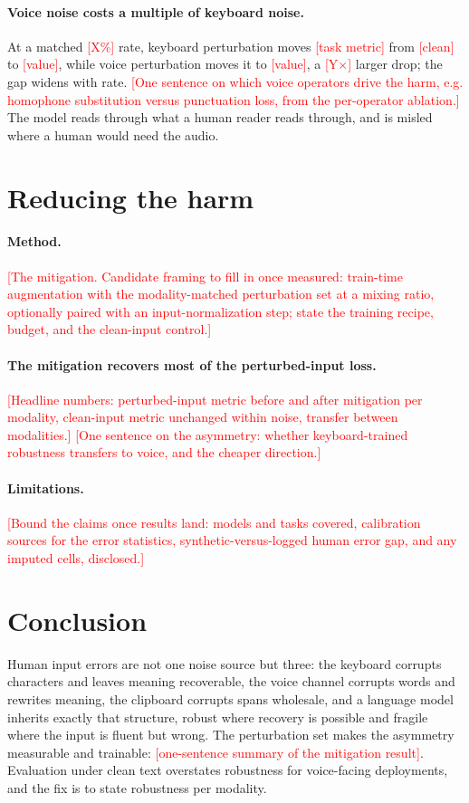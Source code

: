 \documentclass[11pt]{article}
\newcommand{\todo}[1]{\textcolor{red}{[#1]}}
\begin{document}
\paragraph{Voice noise costs a multiple of keyboard noise.} At a matched \todo{X\%} rate,
keyboard perturbation moves \todo{task metric} from \todo{clean} to \todo{value}, while voice
perturbation moves it to \todo{value}, a \todo{Y$\times$} larger drop; the gap widens with rate.
\todo{One sentence on which voice operators drive the harm, e.g. homophone substitution versus
punctuation loss, from the per-operator ablation.} The model reads through what a human reader
reads through, and is misled where a human would need the audio.

\section{Reducing the harm}
\label{sec:method}

\paragraph{Method.} \todo{The mitigation. Candidate framing to fill in once measured: train-time
augmentation with the modality-matched perturbation set at a mixing ratio, optionally paired with
an input-normalization step; state the training recipe, budget, and the clean-input control.}

\paragraph{The mitigation recovers most of the perturbed-input loss.} \todo{Headline numbers:
perturbed-input metric before and after mitigation per modality, clean-input metric unchanged
within noise, transfer between modalities.} \todo{One sentence on the asymmetry: whether
keyboard-trained robustness transfers to voice, and the cheaper direction.}

\paragraph{Limitations.} \todo{Bound the claims once results land: models and tasks covered,
calibration sources for the error statistics, synthetic-versus-logged human error gap, and any
imputed cells, disclosed.}

\section{Conclusion}
Human input errors are not one noise source but three: the keyboard corrupts characters and
leaves meaning recoverable, the voice channel corrupts words and rewrites meaning, the clipboard
corrupts spans wholesale, and a language model inherits exactly that structure, robust where
recovery is possible and fragile where the input is fluent but wrong. The perturbation set makes the asymmetry measurable and trainable:
\todo{one-sentence summary of the mitigation result}. Evaluation under clean text overstates
robustness for voice-facing deployments, and the fix is to state robustness per modality.
\end{document}
